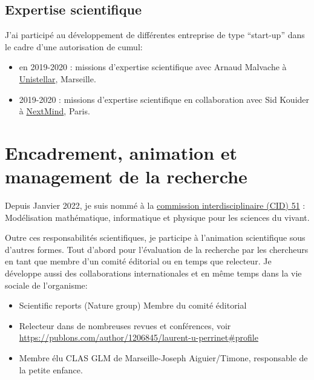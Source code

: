 \documentclass[10pt,french,a4paper,oneside]{article}%
\begin{document}
\subsection{Expertise scientifique} %

J'ai participé au développement de différentes entreprise de type ``start-up'' dans le cadre d'une autorisation de cumul:

\begin{itemize}
	\item en 2019-2020 : missions d'expertise scientifique avec Arnaud Malvache à \href{https://unistellaroptics.com/}{Unistellar}, Marseille.

	\item 2019-2020 : missions d'expertise scientifique en collaboration avec Sid Kouider à \href{https://www.next-mind.com/}{NextMind}, Paris.
\end{itemize}

\section{Encadrement, animation et management de la recherche}


Depuis Janvier 2022, je suis nommé à la \href{https://www.cnrs.fr/comitenational/cid/cid.php?cid=51}{commission interdisciplinaire (CID) 51} : Modélisation mathématique, informatique et physique pour les sciences du vivant.

Outre ces responsabilités scientifiques, je participe à l'animation scientifique sous d'autres formes. Tout d'abord pour l'évaluation de la recherche par les chercheurs en tant que membre d'un comité éditorial ou en temps que relecteur. Je développe aussi des collaborations internationales et en même temps dans la vie sociale de l'organisme:


\begin{itemize}

	\item Scientific reports (Nature group) Membre du comité éditorial

	\item  Relecteur dans de nombreuses revues et conférences, voir \url{https://publons.com/author/1206845/laurent-u-perrinet#profile}

	\item Membre élu CLAS GLM de Marseille-Joseph Aiguier/Timone, responsable de la petite enfance.

\end{itemize}



\printbibliography
\end{document}
